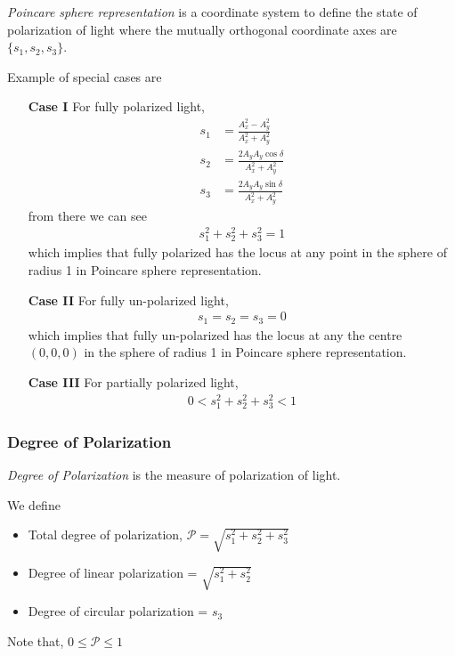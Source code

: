 \documentclass[11pt,a4paper]{article}
\numberwithin{equation}{section}
\begin{document}
\textit{Poincare sphere representation} is a coordinate system to define the state of polarization of light where the mutually orthogonal coordinate axes are $\{ s_1, s_2, s_3 \}$.
\begin{center}
	\label{fig:poincare}
\end{center}

Example of special cases are
\begin{enumerate}
	\item[\textbf{Case I}] For fully polarized light,
	\begin{align}
		s_1&=\frac{A_x^2 - A_y^2}{A_x^2 + A_y^2}\\
		s_2&=\frac{2A_yA_y\cos\delta}{A_x^2 + A_y^2}\\
		s_3&=\frac{2A_yA_y\sin\delta}{A_x^2 + A_y^2}
	\end{align}
from there we can see
\begin{align}
	s_1^2+s_2^2+s_3^2=1 \label{eq:1.29}
\end{align}
which implies that fully polarized has the locus at any point in the sphere of radius 1 in Poincare sphere representation.

\item[\textbf{Case II}] For fully un-polarized light,
\begin{align}
	s_1=s_2=s_3=0
\end{align}
which implies that fully un-polarized has the locus at any the centre $(0,0,0)$ in the sphere of radius 1 in Poincare sphere representation.

\item[\textbf{Case III}] For partially polarized light,
\begin{align}
	0<s_1^2+s_2^2+s_3^2<1
\end{align}
\end{enumerate}

\subsubsection{Degree of Polarization}
\textit{Degree of Polarization} is the measure of polarization of light.

We define
\begin{itemize}
	\item Total degree of polarization, $\mathcal{P} = \sqrt{s_1^2+s_2^2+s_3^2}$
	\item Degree of linear polarization = $\sqrt{s_1^2+s_2^2}$
	\item Degree of circular polarization = $s_3$
\end{itemize}
Note that, $0\le\mathcal{P}\le1$
\end{document}
